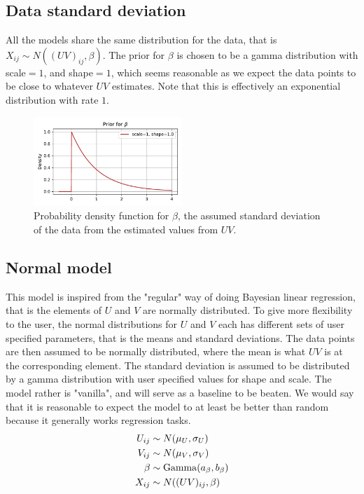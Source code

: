 \documentclass[12pt]{article}
\begin{document}
    \subsection*{Data standard deviation}
        All the models share the same distribution for the data, that is $X_{ij}\sim N((UV)_{ij}, \beta)$. The prior for $\beta$ is chosen to be a gamma distribution with scale$=1$, and shape$=1$, which seems reasonable as we expect the data points to be close to whatever $UV$ estimates. Note that this is effectively an exponential distribution with rate $1$.
    
        \begin{figure}[H]
            \centering
            \includegraphics[width=0.5\textwidth]{betaprior.pdf}
            \caption{Probability density function for $\beta$, the assumed standard deviation of the data from the estimated values from $UV$.}
        \end{figure}
    
    \subsection{Normal model}
    This model is inspired from the "regular" way of doing Bayesian linear regression, that is the elements of $U$ and $V$ are normally distributed. To give more flexibility to the user, the normal distributions for $U$ and $V$ each has different sets of user specified parameters, that is the means and standard deviations. The data points are then assumed to be normally distributed, where the mean is what $UV$ is at the corresponding element. The standard deviation is assumed to be distributed by a gamma distribution with user specified values for shape and scale. The model rather is "vanilla", and will serve as a baseline to be beaten. We would say that it is reasonable to expect the model to at least be better than random because it generally works regression tasks.
    \begin{align*}
        U_{ij}  &\sim N(\mu_U, \sigma_U) \\
        V_{ij}  &\sim N(\mu_V, \sigma_V) \\
        \beta  &\sim \operatorname{Gamma}(a_\beta, b_\beta) \\
        X_{ij} &\sim N((UV)_{ij}, \beta) 
    \end{align*}
\end{document}
